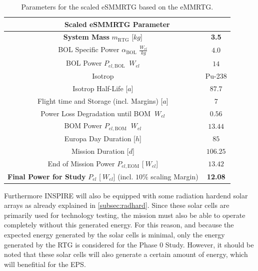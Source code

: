 \begin{table}[H]
\centering
\begin{tabular}{|c|c|}
\hline
\multicolumn{2}{|c|}{Scaled eSMMRTG Parameter}                \\ \hline
\textbf{System Mass} $m_\text{RTG}$ [$kg$]                             & \textbf{3.5}     \\ \hline
BOL Specific Power $\alpha_\text{BOL}$ $\frac{W_{el}}{kg}$  & $4.0$     \\ \hline
BOL Power $P_{el,\text{BOL}}$ $\ W_{el}$                    & $14$       \\ \hline
Isotrop                                                     & Pu-238   \\ \hline
Isotrop Half-Life [$a$]                                       & $87.7$     \\ \hline
Flight time and Storage (incl. Margins) [$a$]                 & $7$        \\ \hline
Power Loss Degradation until BOM $\ W_{el}$                 & $0.56$     \\ \hline
BOM Power $P_{el,\text{BOM}}$ $\ W_{el}$                    & $13.44$    \\ \hline
Europa Day Duration [$h$]                                     & $85$       \\ \hline
Mission Duration [$d$]                                        & $106.25$   \\ \hline
End of Mission Power $P_{el,\text{EOM}}$ [$\ W_{el}$]         & $13.42$   \\ \hline
\textbf{Final Power for Study} $P_{el}$ [$\ W_{el}$] (incl. $10\%$ scaling Margin) & \textbf{12.08}    \\ \hline

\end{tabular}
\caption{Parameters for the scaled eSMMRTG based on the eMMRTG.}
\label{tab:esmmrtg}
\end{table}

Furthermore INSPIRE will also be equipped with some radiation hardend solar arrays as already explained in \autoref{subsec:radhard}\cite{FraunhoferInstituteforSolarEnergySystemsISE.2021}. Since these solar cells are primarily used for technology testing, the mission must also be able to operate completely without this generated energy. For this reason, and because the expected energy generated by the solar cells is minimal, only the energy generated by the RTG is considered for the Phase 0 Study. However, it should be noted that these solar cells will also generate a certain amount of energy, which will benefitial for the EPS.



